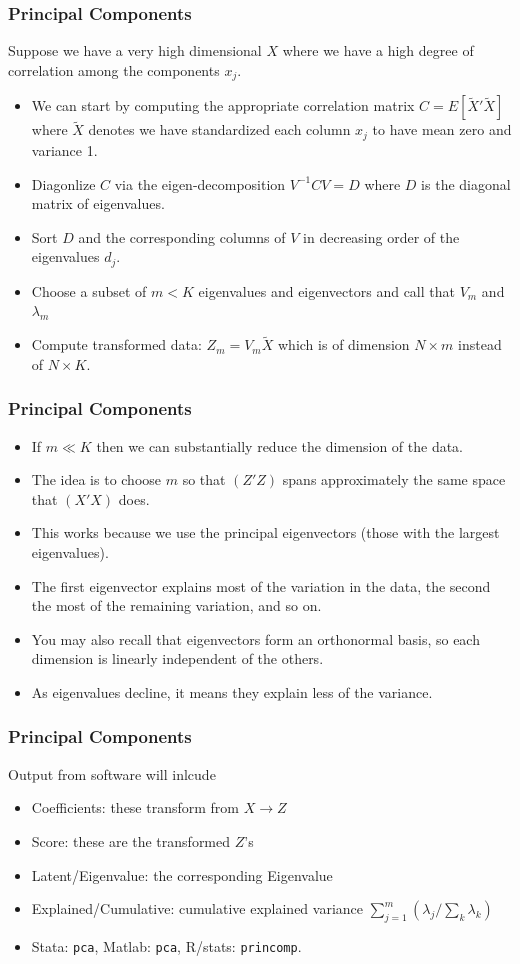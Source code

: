 \documentclass[xcolor=pdftex,dvipsnames,table,mathserif,aspectratio=169]{beamer}
\begin{document}
\begin{frame}
\frametitle{Principal Components}
Suppose we have a very high dimensional $X$ where we have a high degree of correlation among the components $x_j$. 
\begin{itemize}
\item We can start by computing the appropriate correlation matrix $C=E[\tilde{X}'\tilde{X}]$ where $\tilde{X}$ denotes we have standardized each column $x_j$ to have mean zero and variance 1.
\item Diagonlize $C$ via the eigen-decomposition $V^{-1} C V = D$ where $D$ is the diagonal matrix of eigenvalues.
\item Sort $D$ and the corresponding columns of $V$ in decreasing order of the eigenvalues $d_j$.
\item Choose a subset of $m < K$ eigenvalues and eigenvectors and call that $V_m$ and $\lambda_m$
\item Compute transformed data: $Z_m = V_m \tilde{X}$ which is of dimension $N \times m$ instead of $N \times K$.
\end{itemize}
\end{frame}

\begin{frame}
\frametitle{Principal Components}
\begin{itemize}
\item If $m \ll K$ then we can substantially reduce the dimension of the data.
\item The idea is to choose $m$ so that $(Z'Z)$ spans approximately the same space that $(X'X)$ does.
\item This works because we use the \alert{principal eigenvectors} (those with the largest eigenvalues).
\item The first eigenvector explains most of the variation in the data, the second the most of the remaining variation, and so on.
\item You may also recall that eigenvectors form an \alert{orthonormal basis}, so each dimension is linearly independent of the others.
\item As eigenvalues decline, it means they explain less of the variance.
\end{itemize}
\end{frame}

\begin{frame}
\frametitle{Principal Components}
Output from software will inlcude
\begin{itemize}
\item Coefficients: these transform from $X\rightarrow Z$
\item Score: these are the transformed $Z$'s
\item Latent/Eigenvalue: the corresponding Eigenvalue
\item Explained/Cumulative: cumulative explained variance $ \sum_{j=1}^m( \lambda_j / \sum_k \lambda_k)$
\item Stata: \texttt{pca}, Matlab: \texttt{pca}, R/stats: \texttt{princomp}.
\end{itemize}
\end{frame}
\end{document}
